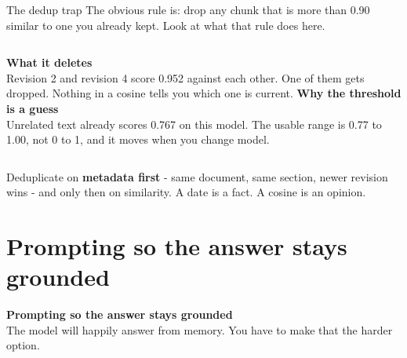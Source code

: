 \documentclass[aspectratio=169]{beamer}
\newcommand{\takebox}[1]{%
  \begin{tcolorbox}[colback=paramgreen!8, colframe=paramgreen, boxrule=0.6pt, arc=2pt]
  #1
  \end{tcolorbox}}
\newcommand{\sectiontransition}[2]{%
  \begin{frame}[plain]
    \vfill
    \begin{center}
      {\Huge\bfseries\color{popblue} #1}\\[1.1em]
      {\large #2}
    \end{center}
    \vfill
  \end{frame}}
\begin{document}
\begin{frame}{The dedup trap}
  \vspace{0.5em}
  The obvious rule is: drop any chunk that is more than 0.90 similar to one you already
  kept. Look at what that rule does here.

  \vspace{0.9em}
  \begin{columns}[T]
      \textbf{\color{armred}What it deletes}\\[0.4em]
      {\small Revision 2 and revision 4 score 0.952 against each other. One of them gets
      dropped. Nothing in a cosine tells you which one is current.}
      \textbf{\color{armred}Why the threshold is a guess}\\[0.4em]
      {\small Unrelated text already scores 0.767 on this model. The usable range is
      0.77 to 1.00, not 0 to 1, and it moves when you change model.}
  \end{columns}

  \vspace{1.1em}
  \takebox{Deduplicate on \textbf{metadata first} - same document, same section, newer
  revision wins - and only then on similarity. A date is a fact. A cosine is an opinion.}
\end{frame}

\section{Prompting so the answer stays grounded}
\sectiontransition{Prompting so the answer stays grounded}{The model will happily answer
from memory. You have to make that the harder option.}
\end{document}
